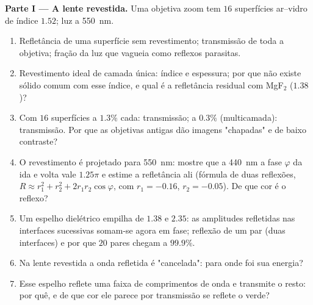 \begin{problem}
\label{pb:b2:wave-interfaces:1}

\medskip
\noindent\textbf{Parte I --- A lente revestida.}
Uma objetiva zoom tem $16$ superfícies ar--vidro de índice $1.52$; luz a
\qty{550}{nm}.
\begin{enumerate}
  \item Refletância de uma superfície sem revestimento; transmissão de toda a
        objetiva; fração da luz que vagueia como reflexos parasitas.
  \item Revestimento ideal de camada única: índice e espessura; por que não
        existe sólido comum com esse índice, e qual é a
        refletância residual com MgF$_2$ ($1.38$)?
  \item Com $16$ superfícies a $1.3\%$ cada: transmissão; a $0.3\%$
        (multicamada): transmissão. Por que as objetivas antigas dão imagens "chapadas"
        e de baixo contraste?
  \item O revestimento é projetado para \qty{550}{nm}: mostre que a
        \qty{440}{nm} a fase $\varphi$ da ida e volta vale $1.25\pi$ e
        estime a refletância ali (fórmula de duas reflexões, $R
        \approx r_1^2 + r_2^2 + 2r_1r_2\cos\varphi$, com $r_1 = -0.16$, $r_2 =
        -0.05$). De que cor é o reflexo?
  \item Um espelho dielétrico empilha  de $1.38$ e
        $2.35$: as amplitudes refletidas nas interfaces sucessivas
        somam-se agora em fase; reflexão de um par (duas interfaces) e
        por que $20$ pares chegam a $99.9\%$.
  \item Na lente revestida a onda refletida é "cancelada": para onde
        foi sua energia?
  \item Esse espelho reflete uma faixa de comprimentos de onda e transmite
        o resto: por quê, e de que cor ele parece por transmissão
        se reflete o verde?
\end{enumerate}


\end{problem}
